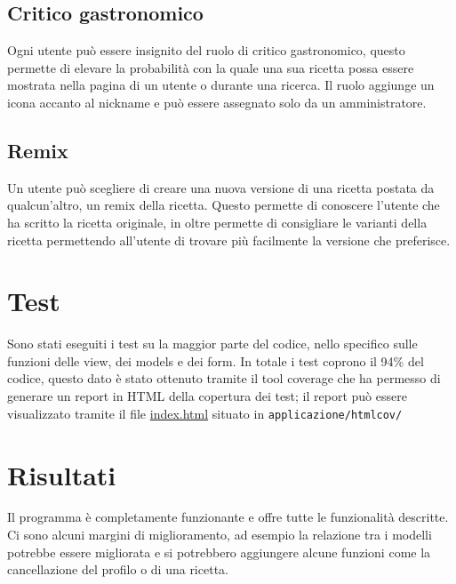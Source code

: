 \documentclass[a4paper]{article}
\newcommand{\code}[1]{\texttt{#1}}
\begin{document}
        
        \subsection{Critico gastronomico}
            Ogni utente può essere insignito del ruolo di critico gastronomico, questo 
            permette di elevare la probabilità con la quale una sua ricetta possa essere 
            mostrata nella pagina di un utente o durante una ricerca.
            Il ruolo aggiunge un icona accanto al nickname e può essere assegnato solo da un amministratore.
        
        
        \subsection{Remix}
            Un utente può scegliere di creare una nuova versione di una ricetta postata 
            da qualcun'altro, un remix della ricetta. Questo permette di conoscere l'utente che 
            ha scritto la ricetta originale, in oltre permette di consigliare le varianti della ricetta
            permettendo all'utente di trovare più facilmente la versione che preferisce.
    
    
    \section{Test}
        Sono stati eseguiti i test su la maggior parte del codice, nello specifico sulle 
        funzioni delle view, dei models e dei form.
        In totale i test coprono il 94\% del codice, questo dato è stato ottenuto tramite 
        il tool coverage che ha permesso di generare un report in HTML della copertura dei test;
        il report può essere visualizzato tramite il file \href{run:./../../applicazione/htmlcov/index.html}{index.html} 
        situato in \code{applicazione/htmlcov/}
    

    \section{Risultati}
        Il programma è completamente funzionante e offre tutte le funzionalità descritte.
        Ci sono alcuni margini di miglioramento, ad esempio la relazione tra i modelli 
        potrebbe essere migliorata e si potrebbero aggiungere alcune funzioni come la cancellazione
        del profilo o di una ricetta.
\end{document}
